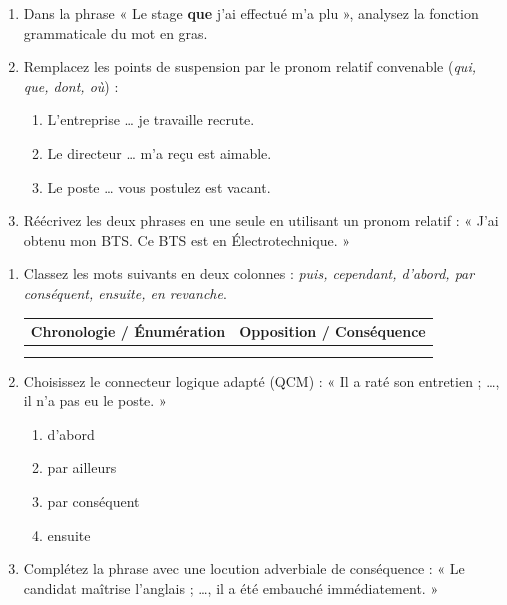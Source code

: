 \documentclass[11pt]{article}
\begin{document}
\begin{exercice}
\begin{enumerate}
    \item Dans la phrase « Le stage \textbf{que} j'ai effectué m'a plu », analysez la fonction grammaticale du mot en gras.
    \item Remplacez les points de suspension par le pronom relatif convenable (\textit{qui, que, dont, où}) :
    \begin{enumerate}
        \item L'entreprise \ldots{} je travaille recrute.
        \item Le directeur \ldots{} m'a reçu est aimable.
        \item Le poste \ldots{} vous postulez est vacant.
    \end{enumerate}
    \item Réécrivez les deux phrases en une seule en utilisant un pronom relatif : « J'ai obtenu mon BTS. Ce BTS est en Électrotechnique. »
\end{enumerate}
\end{exercice}

\begin{exercice}
\begin{enumerate}
    \item Classez les mots suivants en deux colonnes : \textit{puis, cependant, d'abord, par conséquent, ensuite, en revanche}.
    \begin{tabular}{|l|l|}
    \hline
    \textbf{Chronologie / Énumération} & \textbf{Opposition / Conséquence} \\
    \hline
    & \\
    \hline
    & \\
    \hline
    \end{tabular}
    \item Choisissez le connecteur logique adapté (QCM) : « Il a raté son entretien ; \ldots{}, il n'a pas eu le poste. »
    \begin{enumerate}
        \item d'abord
        \item par ailleurs
        \item par conséquent
        \item ensuite
    \end{enumerate}
    \item Complétez la phrase avec une locution adverbiale de conséquence : « Le candidat maîtrise l'anglais ; \ldots{}, il a été embauché immédiatement. »
\end{enumerate}
\end{exercice}
\end{document}
